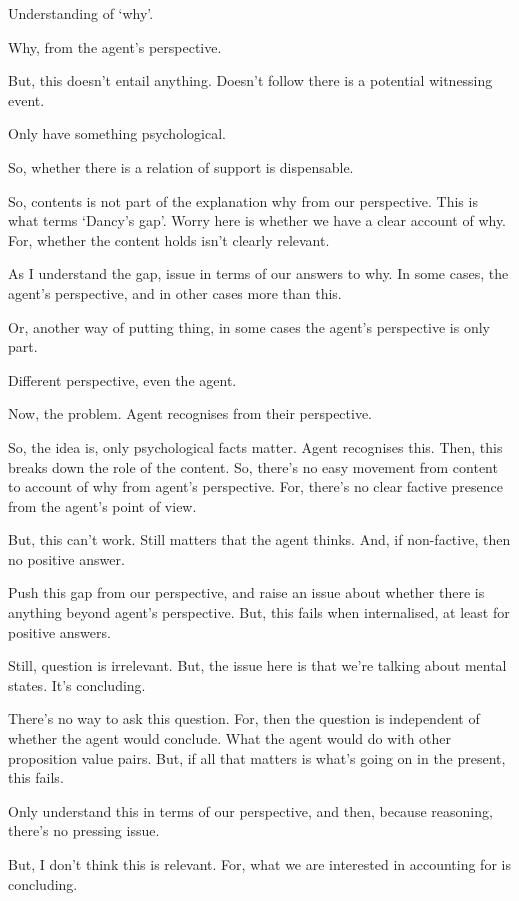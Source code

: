 \begin{note}
  Understanding of `why'.

  Why, from the agent's perspective.

  But, this doesn't entail anything.
  Doesn't follow there is a potential witnessing event.

  Only have something psychological.

  So, whether there is a relation of support is dispensable.

  So, contents is not part of the explanation why from our perspective.
  This is what \citeauthor{Hieronymi:2011aa} terms `Dancy's gap'.
  Worry here is whether we have a clear account of why.
  For, whether the content holds isn't clearly relevant.

  As I understand the gap, issue in terms of our answers to why.
  In some cases, the agent's perspective, and in other cases more than this.

  Or, another way of putting thing, in some cases the agent's perspective is only part.

  Different perspective, even the agent.

  Now, the problem.
  Agent recognises from their perspective.

  So, the idea is, only psychological facts matter.
  Agent recognises this.
  Then, this breaks down the role of the content.
  So, there's no easy movement from content to account of why from agent's perspective.
  For, there's no clear factive presence from the agent's point of view.

  But, this can't work.
  Still matters that the agent thinks.
  And, if non-factive, then no positive answer.

  Push this gap from our perspective, and raise an issue about whether there is anything beyond agent's perspective.
  But, this fails when internalised, at least for positive answers.

  Still, question is irrelevant.
  But, the issue here is that we're talking about mental states.
  It's concluding.

  There's no way to ask this question.
  For, then the question is independent of whether the agent would conclude.
  What the agent would do with other proposition value pairs.
  But, if all that matters is what's going on in the present, this fails.

  Only understand this in terms of our perspective, and then, because reasoning, there's no pressing issue.

  But, I don't think this is relevant.
  For, what we are interested in accounting for is concluding.
\end{note}

